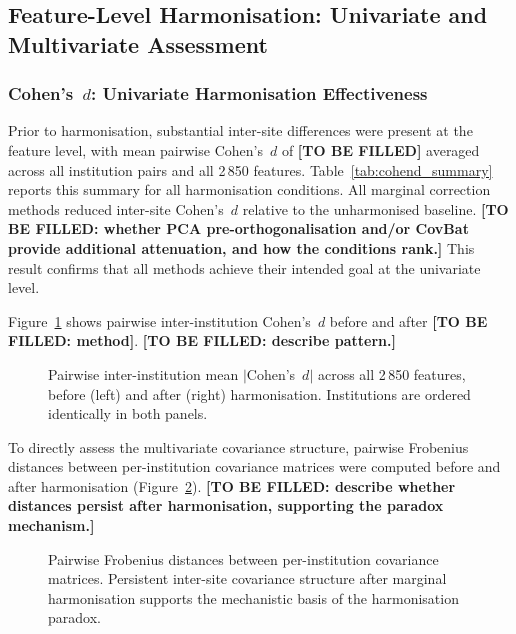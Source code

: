 \documentclass[preprint,12pt]{elsarticle}
\begin{document}
\subsection{Feature-Level Harmonisation: Univariate and Multivariate
Assessment}
\label{subsec:harmonisation_results}

\subsubsection{Cohen's~\texorpdfstring{$d$}{d}: Univariate
Harmonisation Effectiveness}

Prior to harmonisation, substantial inter-site differences were
present at the feature level, with mean pairwise Cohen's~$d$
of \textbf{[TO BE FILLED]} averaged across all institution pairs and
all 2\,850 features.
Table~\ref{tab:cohend_summary} reports this summary for all
harmonisation conditions.
All marginal correction methods reduced inter-site Cohen's~$d$
relative to the unharmonised baseline.
\textbf{[TO BE FILLED: whether PCA pre-orthogonalisation and/or CovBat
provide additional attenuation, and how the conditions rank.]}
This result confirms that all methods achieve their intended goal at
the univariate level.

Figure~\ref{fig:cohend_heatmap} shows pairwise inter-institution
Cohen's~$d$ before and after \textbf{[TO BE FILLED: method]}.
\textbf{[TO BE FILLED: describe pattern.]}

\begin{figure}[htbp]
  \centering
  \caption{Pairwise inter-institution mean $|$Cohen's~$d|$ across all
    2\,850 features, before (left) and after (right) harmonisation.
    Institutions are ordered identically in both panels.}
  \label{fig:cohend_heatmap}
\end{figure}

To directly assess the multivariate covariance structure, pairwise
Frobenius distances between per-institution covariance matrices were
computed before and after harmonisation
(Figure~\ref{fig:covariance_distances}).
\textbf{[TO BE FILLED: describe whether distances persist after
harmonisation, supporting the paradox mechanism.]}

\begin{figure}[htbp]
  \centering
  \caption{Pairwise Frobenius distances between per-institution
    covariance matrices. Persistent inter-site covariance structure
    after marginal harmonisation supports the mechanistic basis of
    the harmonisation paradox.}
  \label{fig:covariance_distances}
\end{figure}
\end{document}
